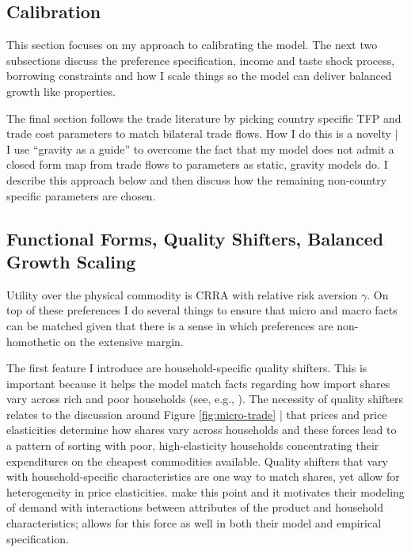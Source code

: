 \documentclass[12pt,pdftex]{article}
\begin{document}
\begin{onehalfspacing}
\section{Calibration}

This section focuses on my approach to calibrating the model. The next two subsections discuss the preference specification, income and taste shock process, borrowing constraints and how I scale things so the model can deliver balanced growth like properties.

The final section follows the trade literature by picking country specific TFP and trade cost parameters to match bilateral trade flows. How I do this is a novelty | I use ``gravity as a guide'' to overcome the fact that my model does not admit a closed form map from trade flows to parameters as static, gravity models do. I describe this approach below and then discuss how the remaining non-country specific parameters are chosen.

\subsection{Functional Forms, Quality Shifters, Balanced Growth Scaling}

Utility over the physical commodity is CRRA with relative risk aversion $\gamma$. On top of these preferences I do several things to ensure that micro and macro facts can be matched given that there is a sense in which preferences are non-homothetic on the extensive margin.

The first feature I introduce are household-specific quality shifters. This is important because it helps the model match facts regarding how import shares vary across rich and poor households (see, e.g., \citet{borusyak2021distributional}). The necessity of quality shifters relates to the discussion around Figure \ref{fig:micro-trade} | that prices and price elasticities determine how shares vary across households and these forces lead to a pattern of sorting with poor, high-elasticity households concentrating their expenditures on the cheapest commodities available. Quality shifters that vary with household-specific characteristics are one way to match shares, yet allow for heterogeneity in price elasticities. \citet{berry1995automobile} make this point and it motivates their modeling of demand with interactions between attributes of the product and household characteristics; \citet{auer2022unequal} allows for this force as well in both their model and empirical specification.


\end{onehalfspacing}
\end{document}
